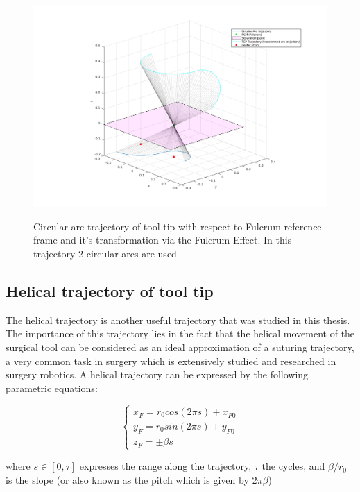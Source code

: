 \begin{center}
\begin{figure}[!htb]
\centering
\includegraphics[width=\textwidth]{images/rcm_trajectories/rcm_arcs_traj.png}\\
\caption{Circular arc trajectory of tool tip with respect to Fulcrum reference frame and it's transformation via the Fulcrum Effect. In this trajectory 2 circular arcs are used}
\end{figure}
\end{center}

\subsection{Helical trajectory of tool tip}

The helical trajectory is another useful trajectory that was studied in this thesis. The importance of this trajectory lies in the fact that the helical movement of the surgical tool can be considered as an ideal 
approximation of a suturing trajectory, a very common task in surgery which is extensively studied and researched in surgery robotics. A helical trajectory can be expressed by the following parametric equations:

\begin{equation}
\begin{cases}
x^{}_{F} = r_0cos(2πs) + x^{}_{F0} \\
y^{}_{F} = r_0sin(2πs) + y^{}_{F0} \\
z^{}_{F} = \pm βs
\end{cases}
\end{equation}

where $s \in \left[ 0, τ \right]$ expresses the range along the trajectory, $τ$ the cycles, and $β/r_0$ is the slope (or also known as the pitch which is given by $2πβ$)

